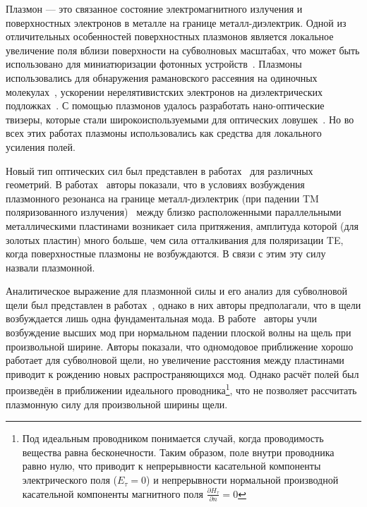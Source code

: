 Плазмон --- это связанное состояние электромагнитного излучения и поверхностных электронов в металле на границе металл-диэлектрик. Одной из отличительных особенностей поверхностных плазмонов является локальное увеличение поля вблизи поверхности на субволновых масштабах, что может быть использовано для миниатюризации фотонных устройств~\cite{barnes2003surface}. Плазмоны использовались для обнаружения рамановского рассеяния на одиночных молекулах~\cite{PhysRevLett.78.1667}, ускорении нерелятивистских электронов на диэлектрических подложках~\cite{breuer2013laser}.
С помощью плазмонов удалось разработать нано-оптические твизеры, которые стали широкоиспользуемыми для оптических ловушек~\cite{juan2011plasmon,xu2002surface}. Но во всех этих работах плазмоны использовались как средства для локального усиления полей.

Новый тип оптических сил был представлен в работах~\cite{roels2009tunable,li2009tunable,dholakia2010colloquium,nesterov2011light,Frumin11} для различных геометрий. В работах~\cite{nesterov2011light,Frumin11} авторы показали, что в условиях возбуждения плазмонного резонанса на границе металл-диэлектрик (при падении TM поляризованного излучения)~\cite{zayats2005nano} между близко расположенными параллельными металлическими пластинами возникает сила притяжения, амплитуда которой (для золотых пластин) много больше, чем сила отталкивания для поляризации TE, когда поверхностные плазмоны не возбуждаются. В связи с этим эту силу назвали плазмонной. 

Аналитическое выражение для плазмонной силы и его анализ для субволновой щели был представлен в работах~\cite{nesterov2011light,Frumin11}, однако в них авторы предполагали, что в щели возбуждается лишь одна фундаментальная мода. В работе~\cite{Shapiro16} авторы учли возбуждение высших мод при нормальном падении плоской волны на щель при произвольной ширине. Авторы показали, что одномодовое приближение хорошо работает для субволновой щели, но увеличение расстояния между пластинами приводит к рождению новых распространяющихся мод. Однако расчёт полей был произведён в приближении идеального проводника\footnote{Под идеальным проводником 
понимается случай, когда проводимость вещества равна бесконечности. Таким образом, поле внутри проводника равно нулю, что приводит к непрерывности касательной компоненты электрического поля ($E_{\tau} = 0$) и непрерывности нормальной производной касательной компоненты магнитного поля 
$\frac{\partial H_{\tau}}{\partial n} = 0$}, что не позволяет рассчитать плазмонную силу для произвольной ширины щели.


